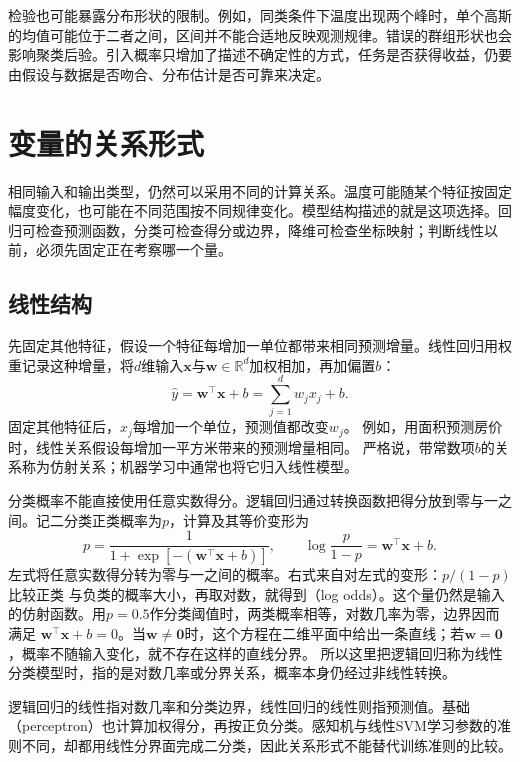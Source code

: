 检验也可能暴露分布形状的限制。例如，同类条件下温度出现两个峰时，单个高斯的均值可能位于二者之间，区间并不能合适地反映观测规律。错误的群组形状也会影响聚类后验。引入概率只增加了描述不确定性的方式，任务是否获得收益，仍要由假设与数据是否吻合、分布估计是否可靠来决定。

\section{变量的关系形式}
\label{sec:models-structure}

相同输入和输出类型，仍然可以采用不同的计算关系。温度可能随某个特征按固定幅度变化，也可能在不同范围按不同规律变化。模型结构描述的就是这项选择。回归可检查预测函数，分类可检查得分或边界，降维可检查坐标映射；判断线性以前，必须先固定正在考察哪一个量。

\subsection{线性结构}
\label{sec:models-linear}

先固定其他特征，假设一个特征每增加一单位都带来相同预测增量。线性回归用权重记录这种增量，将$d$维输入$\bm{x}$与$\bm{w}\in\mathbb{R}^{d}$加权相加，再加偏置$b$：
\begin{equation}
  \hat{y}=\bm{w}^{\top}\bm{x}+b
  =\sum_{j=1}^{d}w_jx_j+b.
  \label{eq:models-linear-score}
\end{equation}
固定其他特征后，$x_j$每增加一个单位，预测值都改变$w_j$。
例如，用面积预测房价时，线性关系假设每增加一平方米带来的预测增量相同。
严格说，带常数项$b$的关系称为仿射关系；机器学习中通常也将它归入线性模型。

分类概率不能直接使用任意实数得分。逻辑回归通过转换函数把得分放到零与一之间。记二分类正类概率为$p$，计算及其等价变形为
\begin{equation}
  p=\frac{1}{1+\exp[-(\bm{w}^{\top}\bm{x}+b)]},
  \qquad
  \log\frac{p}{1-p}=\bm{w}^{\top}\bm{x}+b.
  \label{eq:models-logistic-structure}
\end{equation}
左式将任意实数得分转为零与一之间的概率。右式来自对左式的变形：$p/(1-p)$比较正类
与负类的概率大小，再取对数，就得到（log odds）。这个量仍然是输入
的仿射函数。用$p=0.5$作分类阈值时，两类概率相等，对数几率为零，边界因而满足
$\bm{w}^{\top}\bm{x}+b=0$。当$\bm w\ne\bm0$时，这个方程在二维平面中给出一条直线；若$\bm w=\bm0$，概率不随输入变化，就不存在这样的直线分界。
所以这里把逻辑回归称为线性分类模型时，指的是对数几率或分界关系，概率本身仍经过非线性转换。

逻辑回归的线性指对数几率和分类边界，线性回归的线性则指预测值。基础（perceptron）也计算加权得分，再按正负分类。感知机与线性SVM学习参数的准则不同，却都用线性分界面完成二分类，因此关系形式不能替代训练准则的比较。

